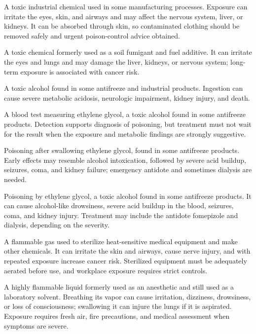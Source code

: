  A toxic industrial chemical used in some manufacturing processes. Exposure can irritate the eyes, skin, and airways and may affect the nervous system, liver, or kidneys. It can be absorbed through skin, so contaminated clothing should be removed safely and urgent poison-control advice obtained.

 A toxic chemical formerly used as a soil fumigant and fuel additive. It can irritate the eyes and lungs and may damage the liver, kidneys, or nervous system; long-term exposure is associated with cancer risk.

 A toxic alcohol found in some antifreeze and industrial products. Ingestion can cause severe metabolic acidosis, neurologic impairment, kidney injury, and death.

 A blood test measuring ethylene glycol, a toxic alcohol found in some antifreeze products. Detection supports diagnosis of poisoning, but treatment must not wait for the result when the exposure and metabolic findings are strongly suggestive.

 Poisoning after swallowing ethylene glycol, found in some antifreeze products. Early effects may resemble alcohol intoxication, followed by severe acid buildup, seizures, coma, and kidney failure; emergency antidote and sometimes dialysis are needed.

 Poisoning by ethylene glycol, a toxic alcohol found in some antifreeze products. It can cause alcohol-like drowsiness, severe acid buildup in the blood, seizures, coma, and kidney injury. Treatment may include the antidote fomepizole and dialysis, depending on the severity.

 A flammable gas used to sterilize heat-sensitive medical equipment and make other chemicals. It can irritate the skin and airways, cause nerve injury, and with repeated exposure increase cancer risk. Sterilized equipment must be adequately aerated before use, and workplace exposure requires strict controls.

 A highly flammable liquid formerly used as an anesthetic and still used as a laboratory solvent. Breathing its vapor can cause irritation, dizziness, drowsiness, or loss of consciousness; swallowing it can injure the lungs if it is aspirated. Exposure requires fresh air, fire precautions, and medical assessment when symptoms are severe.

